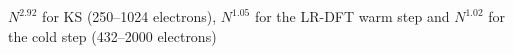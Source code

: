 $N^{2.92}$ for KS (250--1024 electrons), $N^{1.05}$ for the LR-DFT warm step and $N^{1.02}$ for the cold step (432--2000 electrons)